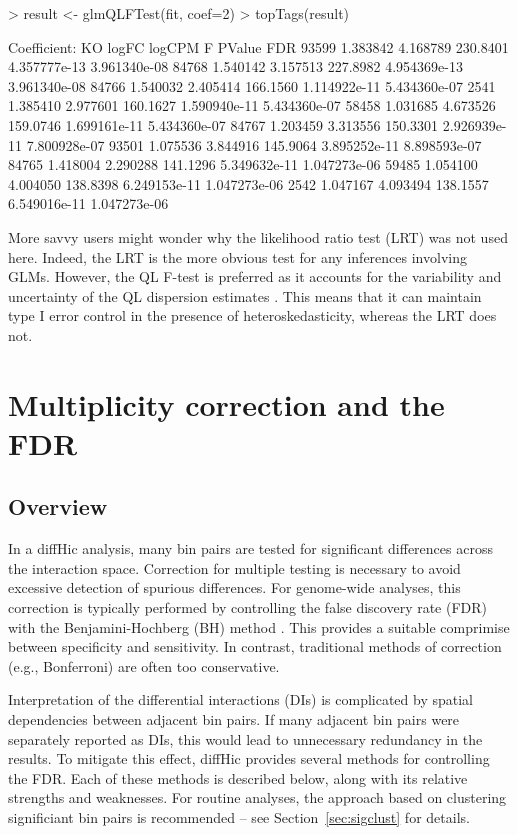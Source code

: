 \documentclass[12pt]{report}
\renewenvironment{Schunk}{\vspace{0pt}}{\vspace{0pt}}
\newcommand{\pkgname}{diffHic}
\begin{document}
\begin{Schunk}
\begin{Sinput}
> result <- glmQLFTest(fit, coef=2)
> topTags(result)
\end{Sinput}
\begin{Soutput}
Coefficient:  KO 
         logFC   logCPM        F       PValue          FDR
93599 1.383842 4.168789 230.8401 4.357777e-13 3.961340e-08
84768 1.540142 3.157513 227.8982 4.954369e-13 3.961340e-08
84766 1.540032 2.405414 166.1560 1.114922e-11 5.434360e-07
2541  1.385410 2.977601 160.1627 1.590940e-11 5.434360e-07
58458 1.031685 4.673526 159.0746 1.699161e-11 5.434360e-07
84767 1.203459 3.313556 150.3301 2.926939e-11 7.800928e-07
93501 1.075536 3.844916 145.9064 3.895252e-11 8.898593e-07
84765 1.418004 2.290288 141.1296 5.349632e-11 1.047273e-06
59485 1.054100 4.004050 138.8398 6.249153e-11 1.047273e-06
2542  1.047167 4.093494 138.1557 6.549016e-11 1.047273e-06
\end{Soutput}
\end{Schunk}

More savvy users might wonder why the likelihood ratio test (LRT) was not used here.
Indeed, the LRT is the more obvious test for any inferences involving GLMs. 
However, the QL F-test is preferred as it accounts for the variability and uncertainty of the QL dispersion estimates \citep{lund2012ql}. 
This means that it can maintain type I error control in the presence of heteroskedasticity, whereas the LRT does not.

\section{Multiplicity correction and the FDR}

\subsection{Overview}
In a \pkgname{} analysis, many bin pairs are tested for significant differences across the interaction space.
Correction for multiple testing is necessary to avoid excessive detection of spurious differences.
For genome-wide analyses, this correction is typically performed by controlling the false discovery rate (FDR) with the Benjamini-Hochberg (BH) method \citep{benjamini1995fdr}. 
This provides a suitable comprimise between specificity and sensitivity.
In contrast, traditional methods of correction (e.g., Bonferroni) are often too conservative.

Interpretation of the differential interactions (DIs) is complicated by spatial dependencies between adjacent bin pairs.
If many adjacent bin pairs were separately reported as DIs, this would lead to unnecessary redundancy in the results.
To mitigate this effect, \pkgname{} provides several methods for controlling the FDR.
Each of these methods is described below, along with its relative strengths and weaknesses.
For routine analyses, the approach based on clustering significiant bin pairs is recommended -- see Section~\ref{sec:sigclust} for details.
\end{document}
